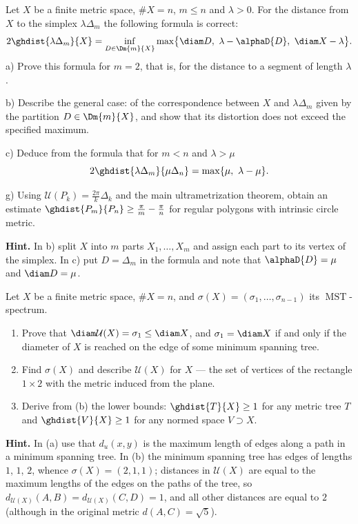 \documentclass[a4paper,12pt]{report}
\begin{document}
\begin{task}
Let $X$ be a finite metric space, $\#X=n$, $m\le n$ and $\lambda>0$. For the distance from $X$ to the simplex $\lambda\Delta_m$ the following formula is correct:
\[
2\ghdist{\lambda\Delta_m}{X}=\inf_{D\in\Dm{m}{X}}\max\bigl\{\diam D,\ \lambda-\alphaD{D},\ \diam X-\lambda\bigr\}.
\]
\textup{a)} Prove this formula for $m=2$, that is, for the distance to a segment of length $\lambda$.

\textup{b)} Describe the general case\textup{:} of the correspondence between $X$ and $\lambda\Delta_m$ given by the partition $D\in\Dm{m}{X}$, and show that its distortion does not exceed the specified maximum.

\textup{c)} Deduce from the formula that for $m<n$ and $\lambda>\mu$
\[
2\ghdist{\lambda\Delta_m}{\mu\Delta_n}=\max\{\mu,\ \lambda-\mu\}.
\]

\textup{g)} Using $\mathcal U(P_k)=\frac{2\pi}{k}\Delta_k$ and the main ultrametrization theorem, obtain an estimate $\ghdist{P_m}{P_n}\ge\frac{\pi}{m}-\frac{\pi}{n}$ for regular polygons with intrinsic circle metric.

\textbf{Hint.} In \textup{b)} split $X$ into $m$ parts $X_1,\dots,X_m$ and assign each part to its vertex of the simplex. In \textup{c)} put $D=\Delta_m$ in the formula and note that $\alphaD{D}=\mu$ and $\diam D=\mu$.
\end{task}

\begin{task}
Let $X$ be a finite metric space, $\#X=n$, and $\sigma(X)=(\sigma_1,\dots,\sigma_{n-1})$ its $\operatorname{MST}$-spectrum.
\begin{enumerate}[label=\textup{(\alph*)}]
\item Prove that $\diam\mathcal U(X)=\sigma_1\le\diam X$, and $\sigma_1=\diam X$ if and only if the diameter of $X$ is reached on the edge of some minimum spanning tree.
\item Find $\sigma(X)$ and describe $\mathcal U(X)$ for $X$ --- the set of vertices of the rectangle $1\times 2$ with the metric induced from the plane.
\item Derive from \textup{(b)} the lower bounds\textup{:} $\ghdist{T}{X}\ge 1$ for any metric tree $T$ and $\ghdist{V}{X}\ge 1$ for any normed space $V\supset X$.
\end{enumerate}

\textbf{Hint.} In \textup{(a)} use that $d_u(x,y)$ is the maximum length of edges along a path in a minimum spanning tree. In \textup{(b)} the minimum spanning tree has edges of lengths $1$, $1$, $2$, whence $\sigma(X)=(2,1,1)$\textup{;} distances in $\mathcal U(X)$ are equal to the maximum lengths of the edges on the paths of the tree, so $d_{\mathcal U(X)}(A,B)=d_{\mathcal U(X)}(C,D)=1$, and all other distances are equal to $2$ \textup{(}although in the original metric $d(A,C)=\sqrt5$\textup{)}.
\end{task}
\end{document}
